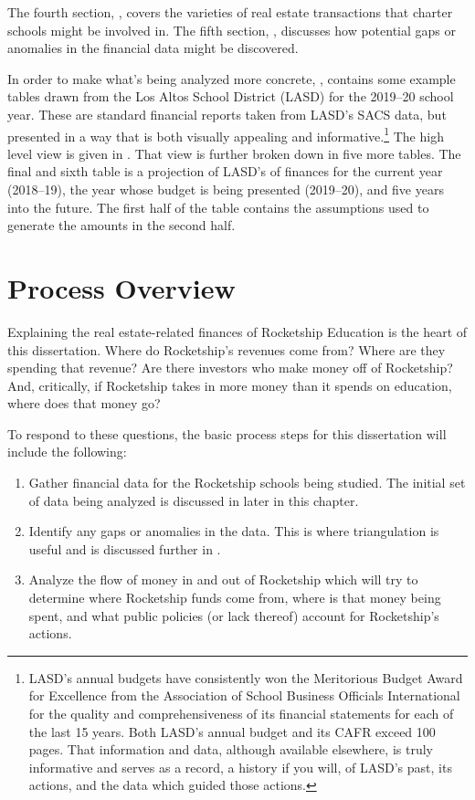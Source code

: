 The fourth section, , covers the varieties of real estate transactions that charter schools might be involved in. The fifth section, , discusses how potential gaps or anomalies in the financial data might be discovered. 

In order to make what's being analyzed more concrete, , contains some example tables drawn from the Los Altos School District (LASD) for the 2019–20 school year. These are standard financial reports taken from LASD's SACS data, but presented in a way that is both visually appealing and informative.\footnote{LASD's annual budgets have consistently won the Meritorious Budget Award for Excellence from the Association of School Business Officials International for the quality and comprehensiveness of its financial statements for each of the last 15 years. Both LASD's annual budget and its CAFR exceed 100 pages. That information and data, although available elsewhere, is truly informative and serves as a record, a history if you will, of LASD's past, its actions, and the data which guided those actions.} The high level view is given in . That view is further broken down in five more tables. The final and sixth table is a projection of LASD's of finances for the current year (2018–19), the year whose budget is being presented (2019–20), and five years into the future. The first half of the table contains the assumptions used to generate the amounts in the second half.

\section{Process Overview}\label{sec:process-overview}\indent

Explaining the real estate-related finances of Rocketship Education is the heart of this dissertation. Where do Rocketship's revenues come from? Where are they spending that revenue? Are there investors who make money off of Rocketship? And, critically, if Rocketship takes in more money than it spends on education, where does that money go?

To respond to these questions, the basic process steps for this dissertation will include the following:

\begin{enumerate}
  \item Gather financial data for the Rocketship schools being studied. The initial set of data being analyzed is discussed in  later in this chapter.
  \item Identify any gaps or anomalies in the data. This is where triangulation is useful and is discussed further in  . 
  \item Analyze the flow of money in and out of Rocketship which will try to determine where Rocketship funds come from, where is that money being spent, and what public policies (or lack thereof) account for Rocketship's actions.
\end{enumerate}


